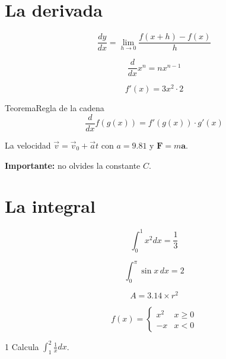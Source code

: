 \documentclass[11pt]{article}
\title{#1}\author{#2}\date{}%
\begin{document}

\section*{La derivada}

\[
\frac{dy}{dx}= \lim_{h \to 0}\frac{f(x + h) - f(x)}{h}
\]

\[
\frac{d}{dx}x^{n} = n x^{n-1}
\]

\[
f'(x) = 3x^{2} \cdot 2
\]

\begin{cltheorem}{Teorema}{Regla de la cadena}
\[
\frac{d}{dx}f(g(x)) = f'(g(x)) \cdot g'(x)
\]
\end{cltheorem}

La velocidad \(\vec{v}= \vec{v}_{0} + \vec{a}t\) con \(a = 9.81\) y \(\mathbf{F}= m \mathbf{a}\).

\textcolor{clRed}{\textbf{Importante: }}no olvides la constante \textcolor{clBlue}{\(C\)}.

\section*{La integral}

\[
\int_{0}^{1} x^{2} dx = \frac{1}{3}
\]

\[
\int_{0}^{\pi}\sin x \, dx = 2
\]

\[
A = 3.14 \times r^{2}
\]

\[
f(x) = \begin{cases}x^{2}&x \geq 0 \\ -x&x < 0\end{cases}
\]

\begin{clproblem}{1}{}
Calcula \(\int_{1}^{2} \frac{1}{x}dx\).

\end{clproblem}
\end{document}
